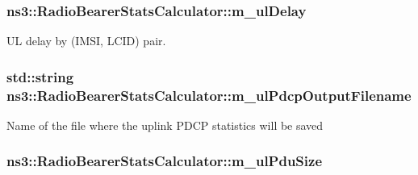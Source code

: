 \subsubsection[{\texorpdfstring{m\+\_\+ul\+Delay}{m_ulDelay}}]{ ns3\+::\+Radio\+Bearer\+Stats\+Calculator\+::m\+\_\+ul\+Delay\hspace{0.3cm}{\ttfamily [private]}}\hypertarget{classns3_1_1RadioBearerStatsCalculator_a1e34e4a6f1f27c5df8076826ab2e9a6b}{}\label{classns3_1_1RadioBearerStatsCalculator_a1e34e4a6f1f27c5df8076826ab2e9a6b}


UL delay by (I\+M\+SI, L\+C\+ID) pair. 

\subsubsection[{\texorpdfstring{m\+\_\+ul\+Pdcp\+Output\+Filename}{m_ulPdcpOutputFilename}}]{\setlength{\rightskip}{0pt plus 5cm}std\+::string ns3\+::\+Radio\+Bearer\+Stats\+Calculator\+::m\+\_\+ul\+Pdcp\+Output\+Filename\hspace{0.3cm}{\ttfamily [private]}}\hypertarget{classns3_1_1RadioBearerStatsCalculator_a980a7ee46cf29b2710f6cd1f73de9636}{}\label{classns3_1_1RadioBearerStatsCalculator_a980a7ee46cf29b2710f6cd1f73de9636}
Name of the file where the uplink P\+D\+CP statistics will be saved 
\subsubsection[{\texorpdfstring{m\+\_\+ul\+Pdu\+Size}{m_ulPduSize}}]{ ns3\+::\+Radio\+Bearer\+Stats\+Calculator\+::m\+\_\+ul\+Pdu\+Size\hspace{0.3cm}{\ttfamily [private]}}\hypertarget{classns3_1_1RadioBearerStatsCalculator_a5894673416a2a7c37ef1ec8295997575}{}\label{classns3_1_1RadioBearerStatsCalculator_a5894673416a2a7c37ef1ec8295997575}


